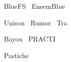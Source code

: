 \cite{reiher:resolving}

BlueFS~\cite{nightingale:bluefs}
EnsemBlue~\cite{nightingale:bluefs}



Unison~\cite{balasubramanian:unison}
Rumor~\cite{guy:rumor}
Tra~\cite{cox:tra}

Bayou~\cite{petersen:flexible-update}
PRACTI~\cite{belaramani:practi}

Pastiche~\cite{cox:pastiche,nguyen:friendstore}


